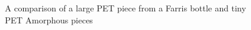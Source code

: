 \begin{figure}[H]
  \newcommand*\FigVSkip{0.5em}
  \newcommand*\FigHSkip{0.1em}
  \newsavebox\FigBox
  \centering
  \begin{minipage}{\wd\FigBox}
    \centering\usebox{\FigBox}
  \end{minipage}
  \begin{minipage}{\wd\FigBox}
    \centering\usebox{\FigBox}
  \end{minipage}
  \caption{A comparison of a large PET piece from a Farris bottle and tiny PET Amorphous pieces}
  \label{fig:size}
\end{figure}
